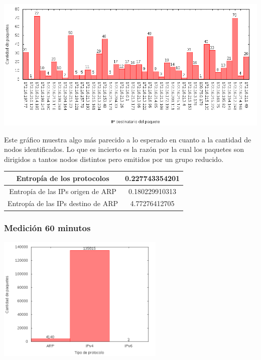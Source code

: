 \begin{center}
\includegraphics[width=16cm]{../mediciones/altop-wifi-10/altop10IpsDstArp.png}
\end{center}

Este gráfico muestra algo más parecido a lo esperado en cuanto a la cantidad de nodos identificados. Lo que es incierto es la razón por la cual
los paquetes son dirigidos a tantos nodos distintos pero emitidos por un grupo reducido.

\begin{center}
\begin{tabular}{|c||c|}
\hline
Entropía de los protocolos & 0.227743354201  \\
\hline
Entropía de las IPs origen de ARP & 0.180229910313  \\
\hline
Entropía de las IPs destino de ARP & 4.77276412705 \\
\hline
\end{tabular}
\end{center}


\subsubsection{Medición 60 minutos}

\begin{center}
\includegraphics[width=8cm]{../mediciones/altop-wifi-60/altop60Protocolos.png}
\end{center}

